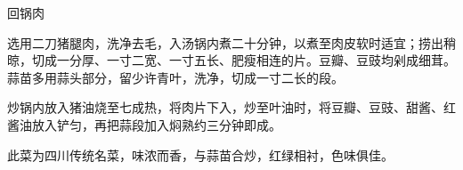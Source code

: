 \begin{recipe}{回锅肉}

\begin{ingredients}
\end{ingredients}

\begin{method}
\item 选用二刀猪腿肉，洗净去毛，入汤锅内煮二十分钟，以煮至肉皮软时适宜；捞出稍晾，切成一分厚、一寸二宽、一寸五长、肥瘦相连的片。豆瓣、豆豉均剁成细茸。蒜苗多用蒜头部分，留少许青叶，洗净，切成一寸二长的段。
\item 炒锅内放入猪油烧至七成热，将肉片下入，炒至叶油时，将豆瓣、豆豉、甜酱、红酱油放入铲匀，再把蒜段加入焖熟约三分钟即成。
\end{method}

\begin{note}
此菜为四川传统名菜，味浓而香，与蒜苗合炒，红绿相衬，色味俱佳。
\end{note}

\end{recipe}

